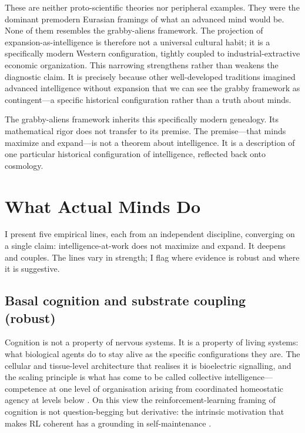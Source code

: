 \documentclass[11pt,twocolumn]{article}
\begin{document}
These are neither proto-scientific theories nor peripheral examples. They
were the dominant premodern Eurasian framings of what an advanced mind
would be. None of them resembles the grabby-aliens framework. The
projection of expansion-as-intelligence is therefore not a universal
cultural habit; it is a specifically modern Western configuration, tightly
coupled to industrial-extractive economic organization. This narrowing
strengthens rather than weakens the diagnostic claim. It is precisely
because other well-developed traditions imagined advanced intelligence
without expansion that we can see the grabby framework as contingent—a
specific historical configuration rather than a truth about minds.

The grabby-aliens framework inherits this specifically modern genealogy.
Its mathematical rigor does not transfer to its premise. The premise—that
minds maximize and expand—is not a theorem about intelligence. It is a
description of one particular historical configuration of intelligence,
reflected back onto cosmology.

\section{What Actual Minds Do}

I present five empirical lines, each from an independent discipline,
converging on a single claim: intelligence-at-work does not maximize and
expand. It deepens and couples. The lines vary in strength; I flag where
evidence is robust and where it is suggestive.

\subsection{Basal cognition and substrate coupling (robust)}

Cognition is not a property of nervous systems. It is a property of
living systems: what biological agents do to stay alive as the specific
configurations they are. The cellular and tissue-level architecture that
realises it is bioelectric signalling, and the scaling principle is what
has come to be called collective intelligence—competence at one level of
organisation arising from coordinated homeostatic agency at levels below
\citep{Lyon2021,Levin2023,McMillenLevin2024}. On this view the
reinforcement-learning framing of cognition is not question-begging but
derivative: the intrinsic motivation that makes RL coherent has a
grounding in self-maintenance \citep{Seifert2024}.
\end{document}
